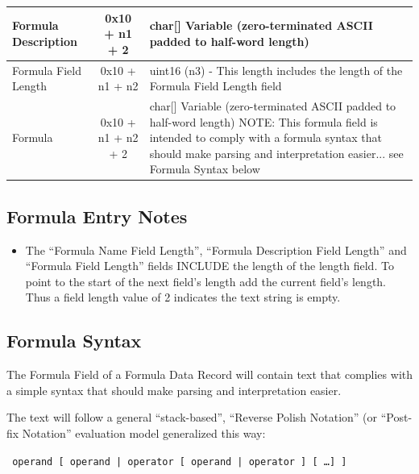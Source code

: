 \documentclass[14]{article}
\begin{document}
\begin{tabular}[l]{|p{5cm}|c|p{7cm}|}
  \hline
  Formula Description & 0x10 + n1 + 2 & char[] Variable (zero-terminated ASCII
                                        padded to half-word length) \\ \hline
  Formula Field Length & 0x10 + n1 + n2 & uint16 (n3) - This length includes the
                                          length of the Formula Field Length
                                          field \\ \hline
  Formula & 0x10 + n1 + n2 + 2 & char[] Variable (zero-terminated ASCII padded to
                                 half-word length) NOTE: This formula field is
                                 intended to comply with a formula syntax that
                                 should make parsing and interpretation
                                 easier... see Formula Syntax below \\ \hline
\end{tabular}

\subsection{Formula Entry Notes}
\begin{itemize}
\item The ``Formula Name Field Length'', ``Formula Description Field Length'' and
  ``Formula Field Length'' fields INCLUDE the length of the length field. To point
  to the start of the next field's length add the current field's length. Thus a
  field length value of 2 indicates the text string is empty.
\end{itemize}

\subsection{Formula Syntax}
The Formula Field of a Formula Data Record will contain text that complies with
a simple syntax that should make parsing and interpretation easier.

The text will follow a general ``stack-based'', ``Reverse Polish Notation'' (or
``Post-fix Notation'' evaluation model generalized this way:

\begin{center}
  \texttt{
    operand [ operand | operator [ operand | operator ] [ \dots ] ]
  }
\end{center}
\end{document}
